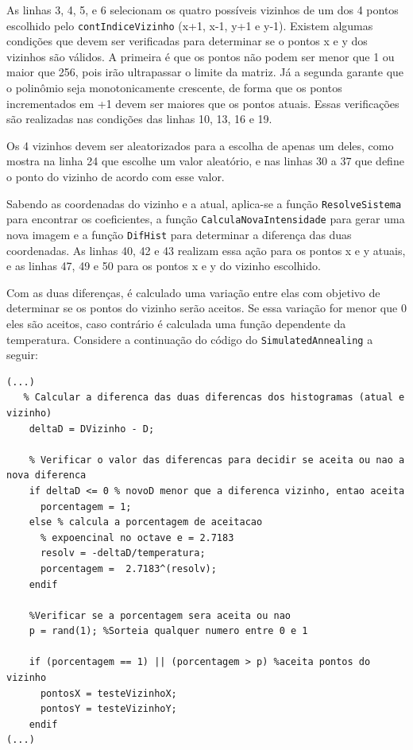 As linhas 3, 4, 5, e 6 selecionam os quatro possíveis vizinhos de um dos 4 pontos escolhido pelo \texttt{contIndiceVizinho} (x+1, x-1, y+1 e y-1). Existem algumas condições que devem ser verificadas para determinar se o pontos x e y dos vizinhos são válidos. A primeira é que os pontos não podem ser menor que 1 ou maior que 256, pois irão ultrapassar o limite da matriz. Já a segunda garante que o polinômio seja monotonicamente crescente, de forma que os pontos incrementados em +1 devem ser maiores que os pontos atuais. Essas verificações são realizadas nas condições das linhas 10, 13, 16 e 19.

Os 4 vizinhos devem ser aleatorizados para a escolha de apenas um deles, como mostra na linha 24 que escolhe um valor aleatório, e nas linhas 30 a 37 que define o ponto do vizinho de acordo com esse valor.

Sabendo as coordenadas do vizinho e a atual, aplica-se a função \texttt{ResolveSistema} para encontrar os coeficientes, a função \texttt{CalculaNovaIntensidade} para gerar uma nova imagem e a função \texttt{DifHist} para determinar a diferença das duas coordenadas. As linhas 40, 42 e 43 realizam essa ação para os pontos x e y atuais, e as linhas 47, 49 e 50 para os pontos x e y do vizinho escolhido.

Com as duas diferenças, é calculado uma variação entre elas com objetivo de determinar se os pontos do vizinho serão aceitos. Se essa variação for menor que 0 eles são aceitos, caso contrário é calculada uma função dependente da temperatura. Considere a continuação do código do \texttt{SimulatedAnnealing} a seguir:

\begin{lstlisting}[style=Matlab-editor]
(...)
   % Calcular a diferenca das duas diferencas dos histogramas (atual e vizinho)
    deltaD = DVizinho - D;
   
    % Verificar o valor das diferencas para decidir se aceita ou nao a nova diferenca
    if deltaD <= 0 % novoD menor que a diferenca vizinho, entao aceita
      porcentagem = 1;
    else % calcula a porcentagem de aceitacao
      % expoencinal no octave e = 2.7183
      resolv = -deltaD/temperatura;
      porcentagem =  2.7183^(resolv);  
    endif

    %Verificar se a porcentagem sera aceita ou nao
    p = rand(1); %Sorteia qualquer numero entre 0 e 1 
  
    if (porcentagem == 1) || (porcentagem > p) %aceita pontos do vizinho
      pontosX = testeVizinhoX;
      pontosY = testeVizinhoY; 
    endif
(...)
\end{lstlisting}

